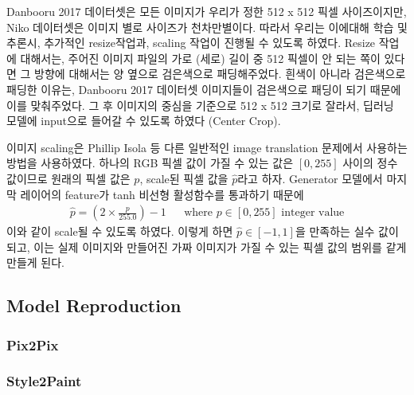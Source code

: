 Danbooru 2017 데이터셋은 모든 이미지가 우리가 정한 512 x 512 픽셀 사이즈이지만, Niko 데이터셋은 이미지 별로 사이즈가 천차만별이다.
따라서 우리는 이에대해 학습 및 추론시, 추가적인 resize작업과, scaling 작업이 진행될 수 있도록 하였다.
Resize 작업에 대해서는, 주어진 이미지 파일의 가로 (세로) 길이 중 512 픽셀이 안 되는 쪽이 있다면 그 방향에 대해서는 양 옆으로 검은색으로 패딩해주었다.
흰색이 아니라 검은색으로 패딩한 이유는, Danbooru 2017 데이터셋 이미지들이 검은색으로 패딩이 되기 때문에 이를 맞춰주었다.
그 후 이미지의 중심을 기준으로 512 x 512 크기로 잘라서, 딥러닝 모델에 input으로 들어갈 수 있도록 하였다 (Center Crop).

이미지 scaling은 Phillip Isola \cite{phillip2017}등 다른 일반적인 image translation 문제에서 사용하는 방법을 사용하였다. 하나의 RGB 픽셀 값이 가질 수 있는 값은 $[0, 255]$ 사이의 정수 값이므로 원래의 픽셀 값은 $p$, scale된 픽셀 값을 $\hat{p}$라고 하자. Generator 모델에서 마지막 레이어의 feature가 tanh 비선형 활성함수를 통과하기 때문에
\begin{align}
	\hat{p} = (2 \times \frac{p}{255.0}) - 1 && \text{where $p \in [0, 255]$ integer value}
\end{align}
이와 같이 scale될 수 있도록 하였다. 이렇게 하면 $\hat{p} \in [-1, 1]$을 만족하는 실수 값이 되고, 이는 실제 이미지와 만들어진 가짜 이미지가 가질 수 있는 픽셀 값의 범위를 같게 만들게 된다.

\subsection{Model Reproduction}

\subsubsection{Pix2Pix}

\subsubsection{Style2Paint}